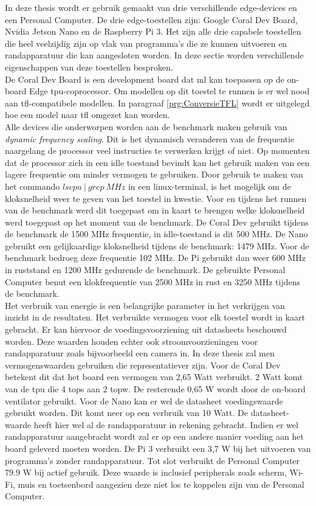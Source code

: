 In deze thesis wordt er gebruik gemaakt van drie verschillende edge-devices en een Personal Computer. De drie edge-toestellen zijn: Google Coral Dev Board, Nvidia Jetson Nano en de Raspberry Pi 3. Het zijn alle drie capabele toestellen die heel veelzijdig zijn op vlak van programma's die ze kunnen uitvoeren en randapparatuur die kan aangesloten worden. In deze sectie worden verschillende eigenschappen van deze toestellen besproken. \\
De Coral Dev Board is een development board dat \gls{ml} kan toepassen op de on-board Edge \gls{tpu}-coprocessor. Om modellen op dit toestel te runnen is er wel nood aan \gls{tfl}-compatibele modellen. In paragraaf \ref{prg:ConversieTFL} wordt er uitgelegd hoe een model naar \gls{tfl} omgezet kan worden. \\
Alle devices die onderworpen worden aan de benchmark maken gebruik van \textit{dynamic frequency scaling}. Dit is het dynamisch veranderen van de frequentie naargelang de processor veel instructies te verwerken krijgt of niet. Op momenten dat de processor zich in een idle toestand bevindt kan het gebruik maken van een lagere frequentie om minder vermogen te gebruiken. Door gebruik te maken van het commando $lscpu~|~grep~ MHz$ in een linux-terminal, is het mogelijk om de kloksnelheid weer te geven van het toestel in kwestie. Voor en tijdens het runnen van de benchmark werd dit toegepast om in kaart te brengen welke kloksnelheid werd toegepast op het moment van de benchmark. De Coral Dev gebruikt tijdens de benchmark de 1500 MHz frequentie, in idle-toestand is dit 500 MHz. De Nano gebruikt een gelijkaardige kloksnelheid tijdens de benchmark: 1479 MHz. Voor de benchmark bedroeg deze frequentie 102 MHz. De Pi gebruikt dan weer 600 MHz in ruststand en 1200 MHz gedurende de benchmark. De gebruikte Personal Computer benut een klokfrequentie van 2500 MHz in rust en 3250 MHz tijdens de benchmark. \\
Het verbruik van energie is een belangrijke parameter in het verkrijgen van inzicht in de resultaten. Het verbruikte vermogen voor elk toestel wordt in kaart gebracht. Er kan hiervoor de voedingsvoorziening uit datasheets beschouwd worden. Deze waarden houden echter ook stroomvoorzieningen voor randapparatuur zoals bijvoorbeeld een camera in. In deze thesis zal men vermogenswaarden gebruiken die representatiever zijn. Voor de Coral Dev betekent dit dat het board een vermogen van 2,65 Watt verbruikt. 2 Watt komt van de \gls{tpu} die 4 \gls{tops} aan 2 \gls{topw}. De resterende 0,65 W wordt door de on-board ventilator gebruikt. Voor de Nano kan er wel de datasheet voedingswaarde gebruikt worden. Dit komt neer op een verbruik van 10 Watt. De datasheet-waarde heeft hier wel al de randapparatuur in rekening gebracht. Indien er wel randapparatuur aangebracht wordt zal er op een andere manier voeding aan het board geleverd moeten worden. De Pi 3 verbruikt een 3,7 W bij het uitvoeren van programma's zonder randapparatuur. Tot slot verbruikt de Personal Computer 79.9 W bij actief gebruik. Deze waarde is inclusief peripherals zoals scherm, Wi-Fi, muis en toetsenbord aangezien deze niet los te koppelen zijn van de Personal Computer.\\
